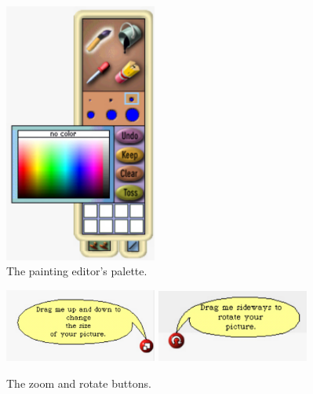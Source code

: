 \begin{figure}
\begin{center}
\includegraphics[width=5cm]{palette}
\end{center}
\caption{The painting editor's palette. \label{fig:palette}}
\end{figure}

\begin{figure}
\begin{center}
\includegraphics[width=5cm]{zoomButton} \includegraphics[width=5cm]{rotateButton}
\end{center}
\caption{The zoom and rotate buttons. \label{fig:zoom}\label{fig:rotate}}
\end{figure}


